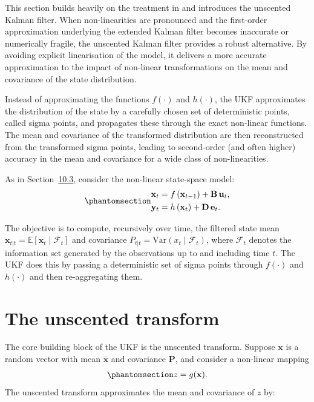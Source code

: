 \documentclass[
  letterpaper,
  DIV=11,
  numbers=noendperiod]{scrreprt}
\begin{document}
This section builds heavily on the treatment in and introduces the
unscented Kalman filter. When non-linearities are pronounced and the
first-order approximation underlying the extended Kalman filter becomes
inaccurate or numerically fragile, the unscented Kalman filter provides
a robust alternative. By avoiding explicit linearisation of the model,
it delivers a more accurate approximation to the impact of non-linear
transformations on the mean and covariance of the state distribution.

Instead of approximating the functions \(f(\cdot)\) and \(h(\cdot)\),
the UKF approximates the distribution of the state by a carefully chosen
set of deterministic points, called sigma points, and propagates these
through the exact non-linear functions. The mean and covariance of the
transformed distribution are then reconstructed from the transformed
sigma points, leading to second-order (and often higher) accuracy in the
mean and covariance for a wide class of non-linearities.

As in Section~\hyperref[sec:ekf]{10.3}, consider the non-linear
state-space model:
\begin{equation}\protect\phantomsection\label{eq-gen-0135}{
\begin{align}
  \mathbf{x}_{t} &= f\left(\mathbf{x}_{t-1} \right) + \mathbf{B}\,\mathbf{u}_t, \\
  \mathbf{y}_{t} &= h\left(\mathbf{x}_{t}\right) + \mathbf{D}\,\mathbf{e}_t. 
\end{align}
}\end{equation}

The objective is to compute, recursively over time, the filtered state
mean \(\mathbf{x}_{t|t} = \mathbb{E}[\mathbf{x}_t \mid \mathcal{F}_t]\)
and covariance \(P_{t|t} = \mathrm{Var}(x_t \mid \mathcal{F}_t)\), where
\(\mathcal{F}_t\) denotes the information set generated by the
observations up to and including time \(t\). The UKF does this by
passing a deterministic set of sigma points through \(f(\cdot)\) and
\(h(\cdot)\) and then re-aggregating them.

\section*{The unscented transform}\label{the-unscented-transform}


The core building block of the UKF is the unscented transform. Suppose
\(\mathbf{x}\) is a random vector with mean \(\bar{\mathbf{x}}\) and
covariance \(\mathbf{P}\), and consider a non-linear mapping
\begin{equation}\protect\phantomsection\label{eq-gen-0136}{
\begin{align}
    z = g(\mathbf{x}).
\end{align}
}\end{equation} The unscented transform approximates the mean and
covariance of \(z\) by:
\end{document}
